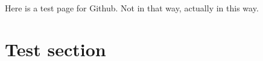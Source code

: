 \documentclass{article}
\begin{document}
Here is a test page for Github. Not in that way, actually in this way.
\section{Test section}
\end{document}
